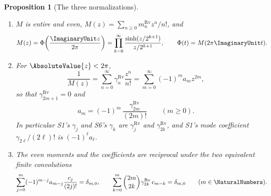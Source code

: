 \documentclass[11pt,oneside]{article}
\theoremstyle{plain}
\newtheorem{proposition}[theorem]{Proposition}
\theoremstyle{definition}
\theoremstyle{remark}
\newcommand{\PhiUp}{\Phi}                                   %
\newcommand{\am}[1]{a_{#1}}                                 %
\begin{document}
\begin{proposition}[The three normalizations]
\label{due:prop:mech-normalizations}
\begin{enumerate}[label=\textup{(\roman*)}]
\item \(M\) is entire and even, \(M(z)=\sum_{n\ge0}m_n^{\mathrm{Rv}}z^{n}/n!\),
and
\begin{equation}
 M(z)=\PhiUp\!\left(\frac{\ImaginaryUnit z}{2\pi}\right)
 =\prod_{k=0}^{\infty}\frac{\sinh(z/2^{k+1})}{z/2^{k+1}},
 \qquad
 \PhiUp(t)=M(2\pi\ImaginaryUnit t).
 \label{due:eq:mech-mgf-product}
\end{equation}
\item For \(\AbsoluteValue{z}<2\pi\),
\begin{equation}
 \frac1{M(z)}=\sum_{n=0}^{\infty}\gamma^{\mathrm{Rv}}_n\frac{z^{n}}{n!}
 =\sum_{m=0}^{\infty}(-1)^{m}\am{m}z^{2m},
 \label{due:eq:mech-gamma-egf}
\end{equation}
so that \(\gamma^{\mathrm{Rv}}_{2m+1}=0\) and
\begin{equation}
 \boxed{\;
 \am{m}=(-1)^{m}\,\frac{\gamma^{\mathrm{Rv}}_{2m}}{(2m)!}
 \qquad(m\ge0).\;}
 \label{due:eq:mech-am-gamma}
\end{equation}
In particular S1's \(\gamma_j\) and S6's \(\gamma_k\) are
\(\gamma^{\mathrm{Rv}}_j\) and \(\gamma^{\mathrm{Rv}}_{2k}\), and S1's mode
coefficient \(\gamma_{2\ell}/(2\ell)!\) is \((-1)^{\ell}\am{\ell}\).
\item The even moments and the coefficients are reciprocal under the two
equivalent finite convolutions
\begin{equation}
 \sum_{j=0}^{m}(-1)^{m-j}\am{m-j}\frac{c_j}{(2j)!}=\delta_{m,0},
 \qquad
 \sum_{k=0}^{m}\binom{2m}{2k}\gamma^{\mathrm{Rv}}_{2k}\,c_{m-k}=\delta_{m,0}
 \qquad(m\in\NaturalNumbers).
 \label{due:eq:mech-moment-convolution}
\end{equation}
\end{enumerate}
\end{proposition}
\end{document}
